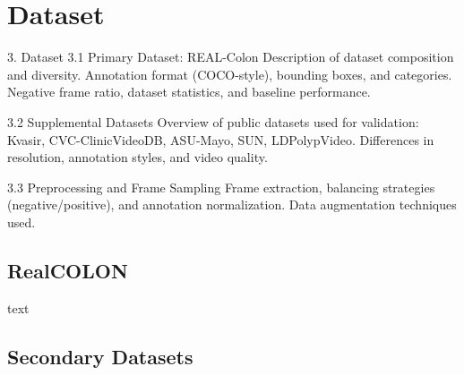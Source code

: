 \section{Dataset}
\label{sec:data}

3. Dataset
    3.1 Primary Dataset: REAL-Colon Description of dataset composition and diversity. Annotation format (COCO-style), bounding boxes, and categories. Negative frame ratio, dataset statistics, and baseline performance.

    3.2 Supplemental Datasets Overview of public datasets used for validation: Kvasir, CVC-ClinicVideoDB, ASU-Mayo, SUN, LDPolypVideo. Differences in resolution, annotation styles, and video quality.

    3.3 Preprocessing and Frame Sampling Frame extraction, balancing strategies (negative/positive), and annotation normalization. Data augmentation techniques used.

\subsection*{RealCOLON}
text

\subsection*{Secondary Datasets}





